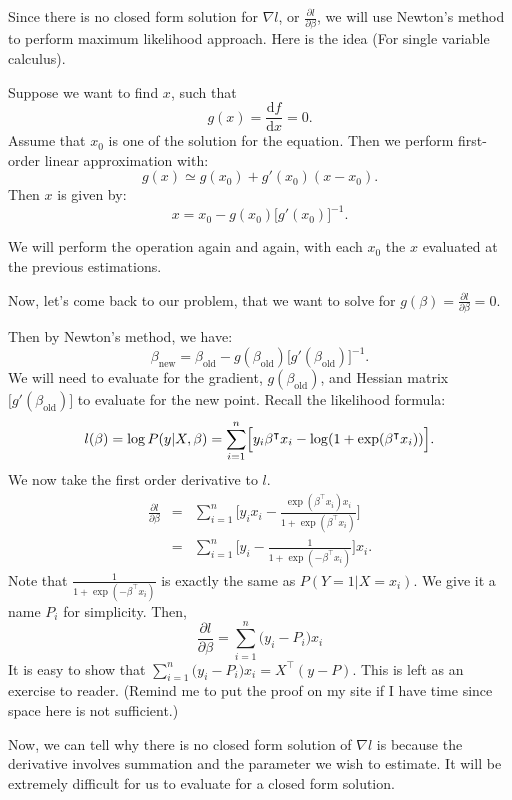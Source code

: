 \documentclass{article}
\theoremstyle{MyNonumberplain}
\theoremstyle{break}
\newcommand{\T}{^\intercal}
\newcommand{\inv}{^{-1}}
\newcommand{\pd}[2]{\frac{\partial {#1}}{\partial {#2}}}
\newcommand{\dd}{\mathrm{d}}
\theoremstyle{break}
\begin{document}
Since there is no closed form solution for $\nabla l$, or $\pd{l}{\beta}$,
we will use Newton's method to perform maximum likelihood approach. Here is the idea (For single variable calculus).

Suppose we want to find $x$, such that 
$$
    g(x) = \frac{\dd{f}}{\dd{x}} = 0.
$$
Assume that $x_0$ is one of the solution for the equation. Then we perform first-order linear approximation with:
$$
    g(x)\simeq g(x_0)+g'(x_0)(x-x_0).
$$
Then $x$ is given by:
$$
    x = x_0-g(x_0)\bigl[g'(x_0)\bigr]\inv.
$$

We will perform the operation again and again, with each $x_0$ the $x$ evaluated at the previous estimations.

Now, let's come back to our problem, that we want to solve for $g(\beta)=\pd{l}{\beta}=0$.

Then by Newton's method, we have:
$$
    \beta_{\text{new}} = \beta_{\text{old}}-g(\beta_{\text{old}})\bigl[g'(\beta_{\text{old}})\bigr]\inv.
$$
We will need to evaluate for the gradient, $g(\beta_{\text{old}})$, and Hessian matrix $\bigl[g'(\beta_{\text{old}})\bigr]$ to evaluate for the new point.
Recall the likelihood formula:
$$
    l(\beta)=\log P(y\vert X,\beta) = \sum_{i=1}^n \Bigl[y_i\beta\T x_i-\log(1+\exp(\beta\T x_i))\Bigr].
$$
We now take the first order derivative to $l$.
\begin{eqnarray*}
    \pd{l}{\beta} &=& \sum_{i=1}^n \Biggl[y_ix_i-\frac{\exp(\beta\T x_i)x_i}{1+\exp(\beta\T x_i)}\Biggr]\\
                  &=& \sum_{i=1}^n \Biggl[y_i-\frac{1}{1+\exp(-\beta\T x_i)}\Biggr]x_i.
\end{eqnarray*}
Note that $\frac{1}{1+\exp(-\beta\T x_i)}$ is exactly the same as $P(Y=1\vert X=x_i)$. We give it a name $P_i$ for simplicity. Then,
$$
\pd{l}{\beta} = \sum_{i=1}^n \bigl(y_i-P_i\bigr)x_i
$$
It is easy to show that $ \sum_{i=1}^n \bigl(y_i-P_i\bigr)x_i = X\T (y-P)$. This is left as an exercise to reader. (Remind me to put the proof on my site if I have time since space here is not sufficient.)

Now, we can tell why there is no closed form solution of $\nabla l$ is because the derivative involves summation and the parameter we wish to estimate.
It will be extremely difficult for us to evaluate for a closed form solution.
\end{document}
